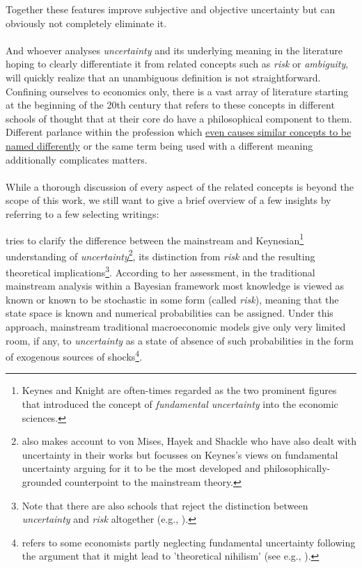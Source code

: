 \documentclass[a4paper,11pt,listof=nochaptergap,oneside,pointednumbers,bibtotoc,bigheadings,liststotoc]{scrbook}
\theoremstyle{mysatz}
\theoremstyle{mydefinition}
\theoremstyle{mytheorem}
\theoremstyle{mybemerkung}
\begin{document}
Together these features improve subjective and objective uncertainty but can obviously not completely eliminate it.\\
\\
And whoever analyses \textit{uncertainty} and its underlying meaning in the literature hoping to clearly differentiate it from related concepts such as \textit{risk} or \textit{ambiguity}, will quickly realize that an unambiguous definition is not straightforward. Confining ourselves to economics only, there is a vast array of literature starting at the beginning of the 20th century that refers to these concepts in different schools of thought that at their core do have a philosophical component to them. Different parlance within the profession which \href{http://www.economics-ejournal.org/economics/discussionpapers/2015-36/file}{even causes similar concepts to be named differently} or the same term being used with a different meaning additionally complicates matters.\\
\\
While a thorough discussion of every aspect of the related concepts is beyond the scope of this work, we still want to give a brief overview of a few insights by referring to a few selecting writings:

\citet{dow:16} tries to clarify the difference between the mainstream and Keynesian\footnote{Keynes and Knight are often-times regarded as the two prominent figures that introduced the concept of \textit{fundamental uncertainty} into the economic sciences.} understanding of \textit{uncertainty}\footnote{\citet{dow:16} also makes account to von Mises, Hayek and Shackle who have also dealt with uncertainty in their works but focusses on Keynes's views on fundamental uncertainty arguing for it to be the most developed and philosophically-grounded counterpoint to the mainstream theory.}, its distinction from \textit{risk} and the resulting theoretical implications\footnote{Note that there are also schools that reject the distinction between \textit{uncertainty} and \textit{risk} altogether (e.g., \citealp{savage:54}).}. According to her assessment, in the traditional mainstream analysis within a Bayesian framework most knowledge is viewed as known or known to be stochastic in some form (called \textit{risk}), meaning that the state space is known and numerical probabilities can be assigned. Under this approach, mainstream traditional macroeconomic models give only very limited room, if any, to \textit{uncertainty} as a state of absence of such probabilities in the form of exogenous sources of shocks\footnote{\citet[p. 43]{dequesh:00} refers to some economists partly neglecting fundamental uncertainty following the argument that it might lead to 'theoretical nihilism' (see e.g., \citealp{coddington:82}).}.
\end{document}

